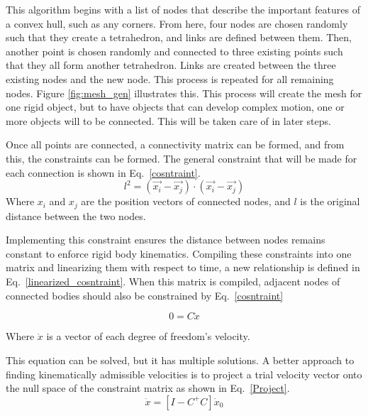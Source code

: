 \documentclass[letterpaper]{article}
\begin{document}
This algorithm begins with a list of nodes that describe the important features of a convex hull, such as any corners. From here, four nodes are chosen randomly such that they create a tetrahedron, and links are defined between them. Then, another point is chosen randomly and connected to three existing points such that they all form another tetrahedron. Links are created between the three existing nodes and the new node. This process is repeated for all remaining nodes. Figure \ref{fig:mesh_gen} illustrates this. This process will create the mesh for one rigid object, but to have objects that can develop complex motion, one or more objects will to be connected. This will be taken care of in later steps.

Once all points are connected, a connectivity matrix can be formed, and from this, the constraints can be formed. The general constraint that will be made for each connection is shown in Eq.~\ref{cosntraint}.
\begin{equation}
    l^2=(\Vec{x_i}-\Vec{x_j})\cdot (\Vec{x_i}-\Vec{x_j}) 
    \label{cosntraint}
\end{equation}
Where $x_i$ and $x_j$ are the position vectors of connected nodes, and $l$ is the original distance between the two nodes. 

Implementing this constraint ensures the distance between nodes remains constant to enforce rigid body kinematics. Compiling these constraints into one matrix and linearizing them with respect to time, a new relationship is defined in Eq.~\ref{linearized_cosntraint}. When this matrix is compiled, adjacent nodes of connected bodies should also be constrained by Eq.~\ref{cosntraint}

\begin{equation}
    0=C\dot x
    \label{linearized_cosntraint}
\end{equation}

Where $\dot x$ is a vector of each degree of freedom's velocity. 

This equation can be solved, but it has multiple solutions. A better approach to finding kinematically admissible velocities is to project a trial velocity vector onto the null space of the constraint matrix as shown in Eq.~\ref{Project}.
\begin{equation}
    \dot x=[I-C^+C]\dot x_0
    \label{Project}
\end{equation}
\end{document}
